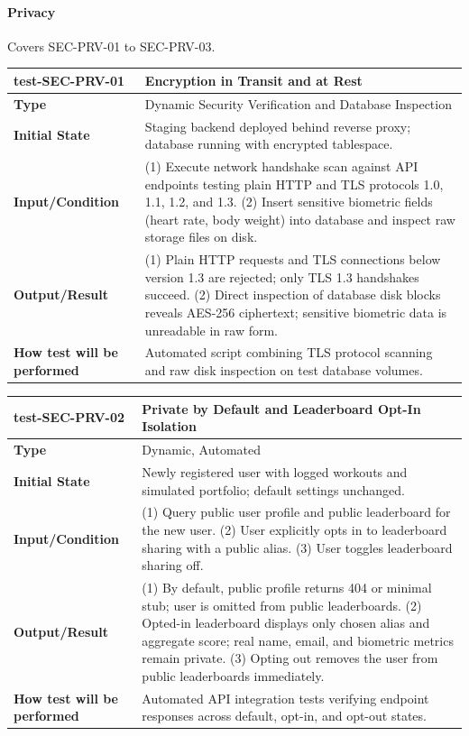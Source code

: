 \documentclass[12pt, titlepage]{article}
\begin{document}
\paragraph{Privacy}

Covers SEC-PRV-01 to SEC-PRV-03.

\noindent\begin{tabularx}{\textwidth}{>{\raggedright\arraybackslash}p{3.5cm}X}
  \toprule
  \textbf{test-SEC-PRV-01} & \textbf{Encryption in Transit and at Rest}\\
  \midrule
  \textbf{Type} & Dynamic Security Verification and Database Inspection\\
  \textbf{Initial State} & Staging backend deployed behind reverse proxy; database running with encrypted tablespace.\\
  \textbf{Input/Condition} & (1) Execute network handshake scan against API endpoints testing plain HTTP and TLS protocols 1.0, 1.1, 1.2, and 1.3. (2) Insert sensitive biometric fields (heart rate, body weight) into database and inspect raw storage files on disk.\\
  \textbf{Output/Result} & (1) Plain HTTP requests and TLS connections below version 1.3 are rejected; only TLS 1.3 handshakes succeed. (2) Direct inspection of database disk blocks reveals AES-256 ciphertext; sensitive biometric data is unreadable in raw form.\\
  \textbf{How test will be performed} & Automated script combining TLS protocol scanning and raw disk inspection on test database volumes.\\
  \bottomrule
\end{tabularx}

\vspace{1em}

\noindent\begin{tabularx}{\textwidth}{>{\raggedright\arraybackslash}p{3.5cm}X}
  \toprule
  \textbf{test-SEC-PRV-02} & \textbf{Private by Default and Leaderboard Opt-In Isolation}\\
  \midrule
  \textbf{Type} & Dynamic, Automated\\
  \textbf{Initial State} & Newly registered user with logged workouts and simulated portfolio; default settings unchanged.\\
  \textbf{Input/Condition} & (1) Query public user profile and public leaderboard for the new user. (2) User explicitly opts in to leaderboard sharing with a public alias. (3) User toggles leaderboard sharing off.\\
  \textbf{Output/Result} & (1) By default, public profile returns 404 or minimal stub; user is omitted from public leaderboards. (2) Opted-in leaderboard displays only chosen alias and aggregate score; real name, email, and biometric metrics remain private. (3) Opting out removes the user from public leaderboards immediately.\\
  \textbf{How test will be performed} & Automated API integration tests verifying endpoint responses across default, opt-in, and opt-out states.\\
  \bottomrule
\end{tabularx}
\end{document}
